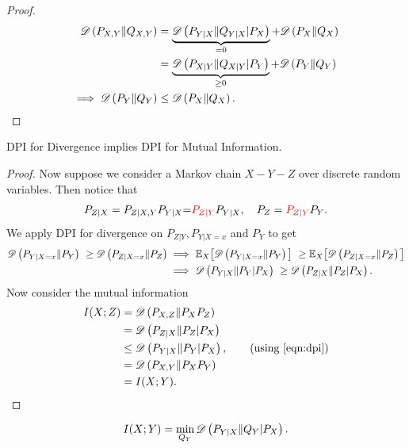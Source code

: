 \documentclass[11pt,a4paper]{article}
\begin{document}
\begin{proof}
    \begin{align*}
        \mathscr{D} \left(P_{X,Y}\|Q_{X,Y}\right)  &= \underbrace{\mathscr{D} \left(P_{Y|X}\|Q_{Y|X} |P_X\right)}_{=0} +  \mathscr{D} \left(P_X\|Q_X\right) \\
            &= \underbrace{\mathscr{D} \left(P_{X|Y}\|Q_{X|Y} |P_Y\right)}_{\geq 0}  + \mathscr{D} \left(P_Y\|Q_Y\right)\\
        \implies \mathscr{D} \left(P_Y\|Q_Y\right) &\le \mathscr{D} \left(P_X\|Q_X\right).
    \end{align*}    
\end{proof}

\begin{theorem}
    DPI for Divergence implies DPI for Mutual Information.
\end{theorem}

\begin{proof}
    Now suppose we consider a Markov chain $X - Y - Z$ over discrete random variables. Then notice that 
    \begin{align*}
        P_{Z|X} = P_{Z|X,Y} P_{Y|X} {=} \textcolor{red}{P_{Z|Y}} P_{Y|X}, \quad P_Z = \textcolor{red}{P_{Z|Y}} P_Y.
    \end{align*}
    We apply DPI for divergence on $P_{Z|Y}, P_{Y|X=x}$ and $P_{Y}$ to get
    \begin{align}
        \mathscr{D} \left(P_{Y|X = x}\|P_{Y}\right)\ \ge \mathscr{D} \left(P_{Z|X = x}\|P_{Z}\right) \implies &\ \mathbb{E}_X \big[\mathscr{D} \left(P_{Y|X = x}\|P_{Y}\right)\big]\ \ge \mathbb{E}_X\big[\mathscr{D} \left(P_{Z|X = x}\| P_{Z}\right)\big] \nonumber \\
        \implies &\ \mathscr{D} \left(P_{Y|X}\|P_{Y} | P_X\right)\ \ge \mathscr{D} \left(P_{Z|X}\| P_{Z} | P_X\right).\label{eqn:dpi}
    \end{align}
    Now consider the mutual information
    \begin{align*}
        I(X;Z) &= \mathscr{D} \left(P_{X,Z}\|P_X P_Z\right) \\
        &= \mathscr{D} \left(P_{Z|X}\|P_Z | P_X\right) \\
        &\le \mathscr{D} \left(P_{Y|X}\|P_Y | P_X\right),\qquad \text{(using \eqref{eqn:dpi})} \\
        &= \mathscr{D} \left(P_{X,Y}\|P_X P_Y\right) \\
        &= I(X; Y).
    \end{align*}
\end{proof}

\begin{theorem}
    \begin{align*}
        I(X;Y) = \min_{Q_{Y}} \mathscr{D} \left(P_{Y|X}\|Q_{Y}|P_{X}\right).
    \end{align*}
\end{theorem}
\end{document}

